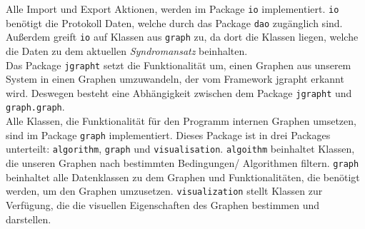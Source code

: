 \documentclass[enabledeprecatedfontcommands,fontsize=11pt,paper=a4,twoside]{scrartcl}
\newcounter{one}
\begin{document}
Alle Import und Export Aktionen, werden im Package \texttt{io} implementiert. \texttt{io} benötigt die Protokoll Daten, welche durch das Package \texttt{dao} zugänglich sind. Außerdem greift \texttt{io} auf Klassen aus \texttt{graph} zu, da dort die Klassen liegen, welche die Daten zu dem aktuellen \textit{Syndromansatz} beinhalten. \\

Das Package \texttt{jgrapht} setzt die Funktionalität um, einen Graphen aus unserem System in einen Graphen umzuwandeln, der vom Framework jgrapht erkannt wird. Deswegen besteht eine Abhängigkeit zwischen dem Package \texttt{jgrapht} und \texttt{graph.graph}. \\

Alle Klassen, die Funktionalität für den Programm internen Graphen umsetzen, sind im Package \texttt{graph} implementiert.  Dieses Package ist in drei Packages unterteilt: \texttt{algorithm}, \texttt{graph} und \texttt{visualisation}. \texttt{algoithm} beinhaltet Klassen, die unseren Graphen nach bestimmten Bedingungen/ Algorithmen filtern. \texttt{graph} beinhaltet alle Datenklassen zu dem Graphen und Funktionalitäten, die benötigt werden, um den Graphen umzusetzen. \texttt{visualization} stellt Klassen zur Verfügung, die die visuellen Eigenschaften des Graphen bestimmen und darstellen. 


\end{document}
